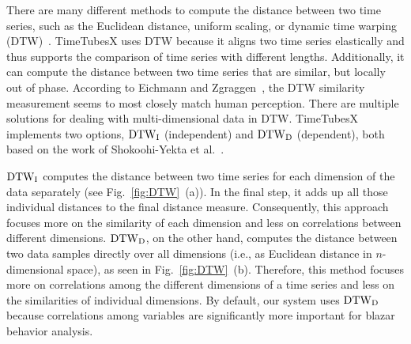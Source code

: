 %
There are many different methods to compute the distance between two time series, such as the Euclidean distance, uniform scaling, or dynamic time warping (DTW)~\cite{Berndt1994}.
TimeTubesX uses DTW
because it aligns two time series elastically and thus supports the comparison of time series with different lengths.
Additionally, it can compute the distance between two time series that are similar, but locally out of phase.
According to Eichmann and Zgraggen~\cite{Eichmann2015}, the DTW similarity measurement seems to most closely match human perception.
There are multiple solutions for dealing with multi-dimensional data in DTW. 
TimeTubesX implements two options, ${\rm DTW}_{\rm I}$ (independent) and ${\rm DTW}_{\rm D}$ (dependent), both based on the work of Shokoohi-Yekta et al.~\cite{Shokoohi-Yekta2015}.

${\rm DTW}_{\rm I}$ computes the distance between two time series for each dimension of the data separately (see Fig.~\ref{fig:DTW}~(a)). In the final step, it adds up all those individual distances to the final distance measure.
Consequently, this approach focuses more on the similarity of each dimension and less on correlations between different dimensions.
${\rm DTW}_{\rm D}$, on the other hand, computes the distance between two data samples directly over all dimensions (i.e., as Euclidean distance in $n$-dimensional space), as seen in Fig.~\ref{fig:DTW}~(b).
Therefore, this method focuses more on correlations among the different dimensions of a time series and less on the similarities of individual dimensions. 
By default, our system uses ${\rm DTW}_{\rm D}$ because correlations among variables are significantly more important for blazar behavior analysis.

